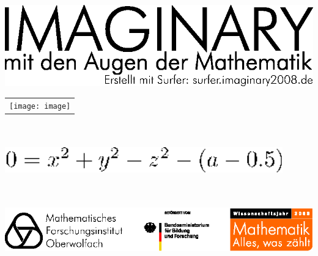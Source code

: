 \documentclass[a5paper]{article}
\begin{document}
\titlepage{}

\begin{center}
\includegraphics[width=14cm]{surfer_print_header}  
\end{center}


\begin{center}
\begin{tabular}{c}
  \texttt{[image: image]}
\end{tabular}

{
\includegraphics[keepaspectratio,height=3.2cm,width=12cm]{eps_formula}
}

\end{center}



\begin{center}
  {\Large
    
  }
\end{center}

\vfill

\begin{center}
\includegraphics[width=14cm]{surfer_print_footer}  
\end{center}
\end{document}

